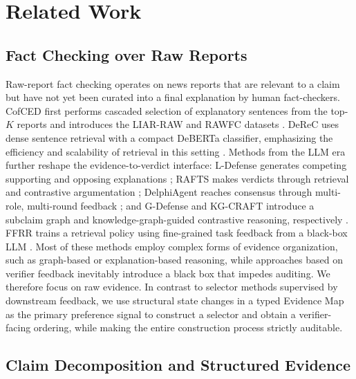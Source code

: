 \documentclass[letterpaper]{article}
\begin{document}
\section{Related Work}

\subsection{Fact Checking over Raw Reports}

Raw-report fact checking operates on news reports that are relevant to a claim but have not yet been curated into a final explanation by human fact-checkers. CofCED first performs cascaded selection of explanatory sentences from the top-$K$ reports and introduces the LIAR-RAW and RAWFC datasets \citep{Yang2022CofCED}. DeReC uses dense sentence retrieval with a compact DeBERTa classifier, emphasizing the efficiency and scalability of retrieval in this setting \citep{Qazi2025DeReC}. Methods from the LLM era further reshape the evidence-to-verdict interface: L-Defense generates competing supporting and opposing explanations \citep{Wang2024LDefense}; RAFTS makes verdicts through retrieval and contrastive argumentation \citep{Yue2024RAFTS}; DelphiAgent reaches consensus through multi-role, multi-round feedback \citep{Xiong2025DelphiAgent}; and G-Defense and KG-CRAFT introduce a subclaim graph and knowledge-graph-guided contrastive reasoning, respectively \citep{Wang2026GDefense,Lourenco2026KGCRAFT}. FFRR trains a retrieval policy using fine-grained task feedback from a black-box LLM \citep{Zhang2024FFRR}. Most of these methods employ complex forms of evidence organization, such as graph-based or explanation-based reasoning, while approaches based on verifier feedback inevitably introduce a black box that impedes auditing. We therefore focus on raw evidence. In contrast to selector methods supervised by downstream feedback, we use structural state changes in a typed Evidence Map as the primary preference signal to construct a selector and obtain a verifier-facing ordering, while making the entire construction process strictly auditable.

\subsection{Claim Decomposition and Structured Evidence}
\end{document}
